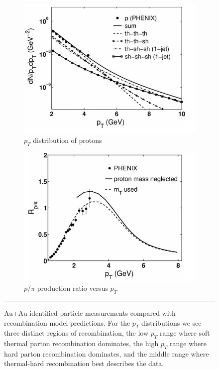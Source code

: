 \begin{figure}
\begin{subfigure}[b]{0.32\textwidth}
    \centering
    \includegraphics[width=\textwidth]{prevplots/pyieldrecomb.JPG}
    \caption{$p_T$ distribution of protons}
    \label{fig:pyieldrecomb}
\end{subfigure}
\begin{subfigure}[b]{0.5\textwidth}
    \centering
    \includegraphics[width=\textwidth]{prevplots/ppiratiorecomb.JPG}
    \caption{$p/\pi$ production ratio versus $p_T$}
    \label{fig:ppiratiorecomb}
\end{subfigure}
\caption[Recombination model compared with Au+Au data]{Au+Au identified particle measurements compared with recombination model predictions. For the $p_T$ distributions we see three distinct regions of recombination, the low $p_T$ range where soft thermal parton recombination dominates, the high $p_T$ range where hard parton recombination dominates, and the middle range where thermal-hard recombination best describes the data.}
\label{fig:hwaAAmodels}    \rule{35em}{0.5pt}
\end{figure}

